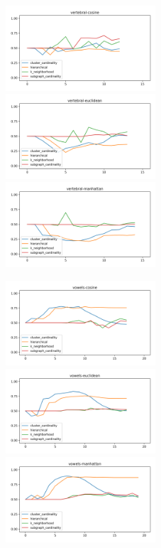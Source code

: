 \begin{figure}[!t]
\includegraphics[width=2.2in]{kdd/static/auc_vs_depth/vertebral-cosine.png}
\includegraphics[width=2.2in]{kdd/static/auc_vs_depth/vertebral-euclidean.png}
\includegraphics[width=2.2in]{kdd/static/auc_vs_depth/vertebral-manhattan.png}

\includegraphics[width=2.2in]{kdd/static/auc_vs_depth/vowels-cosine.png}
\includegraphics[width=2.2in]{kdd/static/auc_vs_depth/vowels-euclidean.png}
\includegraphics[width=2.2in]{kdd/static/auc_vs_depth/vowels-manhattan.png}


\end{figure}
